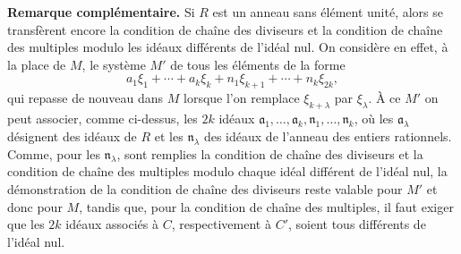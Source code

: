 \medskip
\noindent\textbf{Remarque complémentaire.} Si $R$ est un anneau sans élément unité, alors se transfèrent encore la condition de chaîne des diviseurs et la condition de chaîne des multiples modulo les idéaux différents de l'idéal nul. On considère en effet, à la place de $M$, le système $M'$ de tous les éléments de la forme
\[
        a_1\xi_1+\cdots+a_k\xi_k+n_1\xi_{k+1}+\cdots+n_k\xi_{2k},
\]
qui repasse de nouveau dans $M$ lorsque l'on remplace $\xi_{k+\lambda}$ par $\xi_\lambda$. À ce $M'$ on peut associer, comme ci-dessus, les $2k$ idéaux $\mathfrak a_1,\ldots,\mathfrak a_k,\mathfrak n_1,\ldots,\mathfrak n_k$, où les $\mathfrak a_\lambda$ désignent des idéaux de $R$ et les $\mathfrak n_\lambda$ des idéaux de l'anneau des entiers rationnels. Comme, pour les $\mathfrak n_\lambda$, sont remplies la condition de chaîne des diviseurs et la condition de chaîne des multiples modulo chaque idéal différent de l'idéal nul, la démonstration de la condition de chaîne des diviseurs reste valable pour $M'$ et donc pour $M$, tandis que, pour la condition de chaîne des multiples, il faut exiger que les $2k$ idéaux associés à $C$, respectivement à $C'$, soient tous différents de l'idéal nul.
